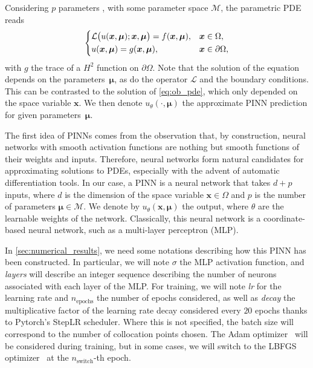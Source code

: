 Considering $p$ parameters , with some parameter space $\mathcal{M}$, the parametric PDE reads
\begin{equation}
	\label{eq:parametric_PDE}
	\begin{dcases}
		\mathcal{L}\big(u(\bm{x},\bm{\mu});\bm{x},\bm{\mu}\big) = f(\bm{x},\bm{\mu}), & \bm{x}\in\Omega, \\
		u(\bm{x},\bm{\mu}) = g(\bm{x},\bm{\mu}),             & \bm{x}\in\partial \Omega, \\
	\end{dcases}
\end{equation}
with $g$ the trace of a $H^2$ function on $\partial \Omega$.
Note that the solution of the equation depends on the parameters~$\bm{\mu}$, as do the operator $\mathcal{L}$ and the boundary conditions.
This can be contrasted to the solution of \eqref{eq:ob_pde}, which only depended on the space variable $\bm{x}$.
We then denote $u_{\theta}(\cdot, \bm{\mu})$ the approximate PINN prediction for given parameters~$\bm{\mu}$.

The first idea of PINNs comes from the observation that, by construction, neural networks with smooth activation functions
are nothing but smooth functions of their weights and inputs.
Therefore, neural networks form natural candidates for approximating solutions to PDEs, especially with the advent of automatic differentiation tools.
In our case, a PINN is a neural network that takes $d+p$ inputs, where $d$ is the dimension of the space variable $\bm{x} \in \Omega$ and $p$ is the number of parameters $\bm{\mu} \in \mathcal{M}$. We denote by $u_{\theta}(\bm{x},\bm{\mu})$ the output, where $\theta$ are the learnable weights of the network.
Classically, this neural network is a coordinate-based neural network, such as a multi-layer perceptron (MLP).

\begin{remark}\label{rmk:PINN_notations}
	In \cref{sec:numerical_results}, we need some notations describing how this PINN has been constructed. In particular, we will note $\sigma$ the MLP activation function, and \textit{layers} will describe an integer sequence describing the number of neurons associated with each layer of the MLP. For training, we will note \textit{lr} for the learning rate and $n_\text{epochs}$ the number of epochs considered, as well as \textit{decay} the multiplicative factor of the learning rate decay considered every $20$ epochs thanks to Pytorch's StepLR scheduler. Where this is not specified, the batch size will correspond to the number of collocation points chosen. The Adam optimizer~\cite{KinBa2015} will be considered during training, but in some cases, we will switch to the LBFGS optimizer~\cite{nocedal_quasi_newton_2006} at the $n_\text{switch}$-th epoch.
\end{remark}

